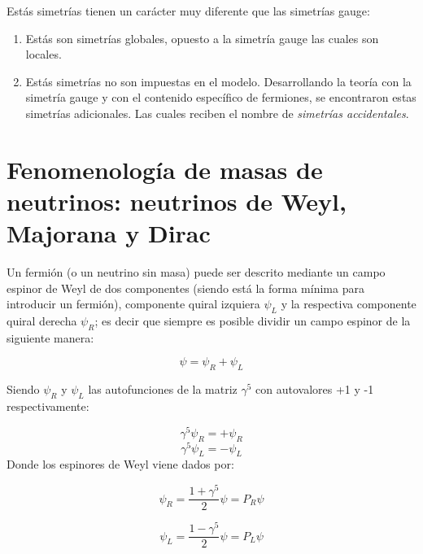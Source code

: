 \documentclass[12pt]{article}
\begin{document}
Estás simetrías tienen un carácter muy diferente que las simetrías gauge: 
\begin{enumerate}
\item Estás son simetrías globales, opuesto a la simetría gauge las cuales son locales. 

\item Estás simetrías no son impuestas en el modelo. Desarrollando la teoría con la simetría gauge y con el contenido específico de fermiones, se encontraron estas simetrías adicionales. Las cuales reciben el nombre de \textit{simetrías accidentales}. 

\end{enumerate}




\section{Fenomenología de masas de neutrinos: neutrinos de Weyl, Majorana y Dirac }

Un fermión (o un neutrino sin masa) puede ser descrito mediante un campo espinor de Weyl de dos componentes (siendo está la forma mínima para introducir un fermión), componente quiral izquiera \(\psi_L\) y la respectiva componente quiral derecha \(\psi_R\); es decir que siempre es posible dividir un campo espinor de la siguiente manera:

\begin{equation}
\psi= \psi_R+ \psi_L
\label{eq:2'}
\end{equation}   

Siendo \(\psi_R\) y \(\psi_L\)  las autofunciones de la matriz \(\gamma^{5}\) con autovalores +1 y -1 respectivamente:

\begin{equation}
\gamma^{5}\psi_R= + \psi_R
\end{equation} 
\begin{equation}
\gamma^{5}\psi_L= - \psi_L
\end{equation} 
Donde los espinores de Weyl viene dados por: 

\begin{equation}
\psi_R= \frac{1+\gamma^{5}}{2}\psi=P_R\psi
\label{eq:2*}
\end{equation} 

\begin{equation}
\psi_L= \frac{1-\gamma^{5}}{2}\psi= P_L\psi
\label{eq:2**}
\end{equation} 
\end{document}
